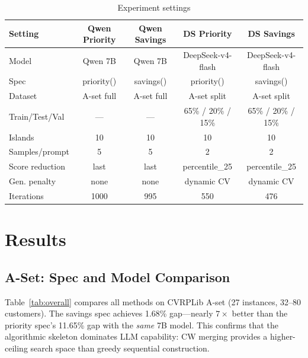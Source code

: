 \documentclass{article}
\begin{document}
\begin{table}[h]
\centering
\small
\caption{Experiment settings}
\label{tab:settings}
\vspace{-4pt}
\begin{tabular}{lcccc}
\toprule
Setting & Qwen Priority & Qwen Savings & DS Priority & DS Savings \\
\midrule
Model & Qwen 7B & Qwen 7B & DeepSeek-v4-flash & DeepSeek-v4-flash \\
Spec & priority() & savings() & priority() & savings() \\
Dataset & A-set full & A-set full & A-set split & A-set split \\
Train/Test/Val & --- & --- & 65\% / 20\% / 15\% & 65\% / 20\% / 15\% \\
Islands & 10 & 10 & 10 & 10 \\
Samples/prompt & 5 & 5 & 2 & 2 \\
Score reduction & last & last & percentile\_25 & percentile\_25 \\
Gen. penalty & none & none & dynamic CV & dynamic CV \\
Iterations & 1000 & 995 & 550 & 476 \\
\bottomrule
\end{tabular}
\vspace{-8pt}
\end{table}

\vspace{-4pt}
\section{Results}
\vspace{-4pt}

\subsection{A-Set: Spec and Model Comparison}
\vspace{-2pt}

Table~\ref{tab:overall} compares all methods on CVRPLib A-set (27 instances, 32--80 customers). The savings spec achieves 1.68\% gap---nearly $7\times$ better than the priority spec's 11.65\% gap with the \emph{same} 7B model. This confirms that the algorithmic skeleton dominates LLM capability: CW merging provides a higher-ceiling search space than greedy sequential construction.
\end{document}
